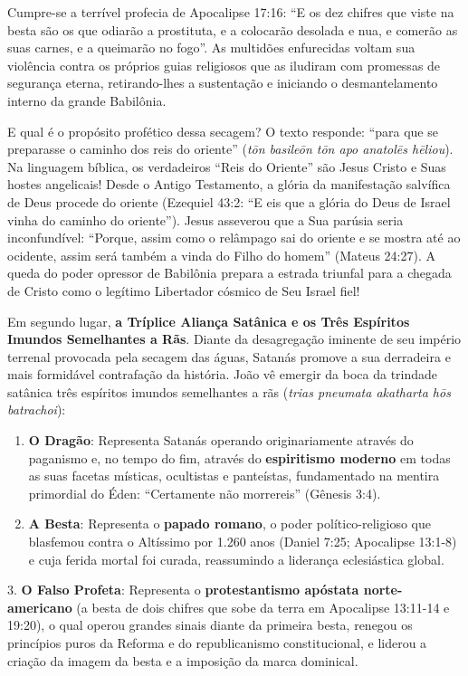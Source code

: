 Cumpre-se a terrível profecia de Apocalipse 17:16:
``E os dez chifres que viste na besta são os que odiarão a prostituta, e a colocarão desolada e nua, e comerão as suas carnes, e a queimarão no fogo''.
As multidões enfurecidas voltam sua violência contra os próprios guias religiosos que as iludiram com promessas de segurança eterna, retirando-lhes a sustentação e iniciando o desmantelamento interno da grande Babilônia.

E qual é o propósito profético dessa secagem? O texto responde: ``para que se preparasse o caminho dos reis do oriente'' (\textit{tōn basileōn tōn apo anatolēs hēliou}).
Na linguagem bíblica, os verdadeiros ``Reis do Oriente'' são Jesus Cristo e Suas hostes angelicais! Desde o Antigo Testamento, a glória da manifestação salvífica de Deus procede do oriente (Ezequiel 43:2: ``E eis que a glória do Deus de Israel vinha do caminho do oriente''). Jesus asseverou que a Sua parúsia seria inconfundível: ``Porque, assim como o relâmpago sai do oriente e se mostra até ao ocidente, assim será também a vinda do Filho do homem'' (Mateus 24:27). A queda do poder opressor de Babilônia prepara a estrada triunfal para a chegada de Cristo como o legítimo Libertador cósmico de Seu Israel fiel!

Em segundo lugar, \textbf{a Tríplice Aliança Satânica e os Três Espíritos Imundos Semelhantes a Rãs}.
Diante da desagregação iminente de seu império terrenal provocada pela secagem das águas, Satanás promove a sua derradeira e mais formidável contrafação da história. João vê emergir da boca da trindade satânica três espíritos imundos semelhantes a rãs (\textit{trias pneumata akatharta hōs batrachoi}):
\begin{enumerate}
  \item \textbf{O Dragão}: Representa Satanás operando originariamente através do paganismo e, no tempo do fim, através do \textbf{espiritismo moderno} em todas as suas facetas místicas, ocultistas e panteístas, fundamentado na mentira primordial do Éden: ``Certamente não morrereis'' (Gênesis 3:4).
  \item \textbf{A Besta}: Representa o \textbf{papado romano}, o poder político-religioso que blasfemou contra o Altíssimo por 1.260 anos (Daniel 7:25; Apocalipse 13:1-8) e cuja ferida mortal foi curada, reassumindo a liderança eclesiástica global.
\end{enumerate}

3. \textbf{O Falso Profeta}: Representa o \textbf{protestantismo apóstata norte-americano} (a besta de dois chifres que sobe da terra em Apocalipse 13:11-14 e 19:20), o qual operou grandes sinais diante da primeira besta, renegou os princípios puros da Reforma e do republicanismo constitucional, e liderou a criação da imagem da besta e a imposição da marca dominical.

